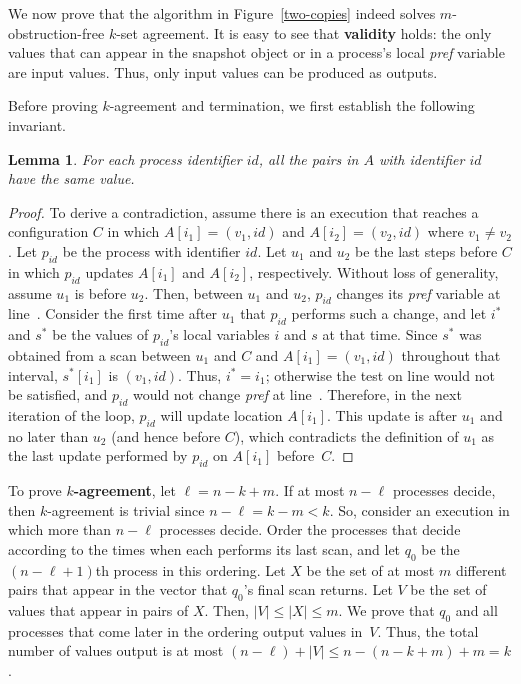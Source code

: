 \documentclass[11pt]{article}
\newtheorem{lemma}[theorem]{Lemma}
\newcounter{linenum}
\newcounter{ind}
\newcommand{\lref}[1]{\linenumref{#1}}
\begin{document}
We now prove that the algorithm in Figure~\ref{two-copies} indeed
solves $m$-obstruction-free $k$-set agreement. 
It is easy to see that {\bf validity} holds: the only values that can appear in the snapshot object or in a process's local {\it pref} variable are input values.  Thus, only input values can
be produced as outputs.  

Before proving $k$-agreement and termination, we 
first establish the following invariant. \begin{lemma}\label{invOne}
For each process identifier $id$, all the pairs in $A$ with identifier $id$ have the same value. 
\end{lemma}

\begin{proof}
To derive a contradiction, assume there is an execution that reaches 
a configuration $C$ in which
$A[i_1]=(v_1,id)$ and $A[i_2]=(v_2,id)$ where $v_1\neq v_2$.
Let $p_{id}$ be the process with identifier $id$.
Let $u_1$ and $u_2$ be the last steps before $C$ in which $p_{id}$ updates 
$A[i_1]$ and $A[i_2]$, respectively.
Without loss of generality, assume $u_1$ is before $u_2$.
Then, between $u_1$ and $u_2$, $p_{id}$ changes its {\it pref}
variable at line~\lref{change-pref}.  Consider the first time after
$u_1$ that $p_{id}$ performs such a change, and let
$i^*$ and $s^*$ be the values of $p_{id}$'s local variables $i$ and $s$ at that time.
Since $s^*$ was obtained from a scan between $u_1$ and $C$ and $A[i_1]=(v_1,id)$ throughout that interval, $s^*[i_1]$ is $(v_1,id)$.
Thus, $i^*=i_1$; otherwise the test on line \lref{cond} would not be satisfied,
and $p_{id}$ would not change {\it pref} at line~\lref{change-pref}.
Therefore, in the next iteration of the loop, $p_{id}$ will update location $A[i_1]$.
This update is after $u_1$ and no later than $u_2$ (and hence before
$C$), which contradicts the definition of $u_1$ as the last update
performed by $p_{id}$ on $A[i_1]$ before~$C$.
\end{proof}


To prove {\bf $k$-agreement}, 
let $\ell=n-k+m$. 
If at most $n-\ell$ processes decide, then $k$-agreement is trivial since
$n-\ell = k-m < k$.
So, consider an execution in which more than $n-\ell$ processes decide.
Order the processes that decide according to the times when each performs its last scan,
and let $q_0$ be the $(n-\ell+1)$th process in this ordering.
Let $X$ be the set of at most $m$ different pairs that appear in the vector that
$q_0$'s final scan returns. Let $V$ be the set of values that appear in pairs of $X$. 
Then, $|V|\leq|X|\leq m$.
We prove that $q_0$ and all processes that come later in the ordering
output values in~$V$.
Thus, the total number of values output is at most $(n-\ell) + |V| \leq n-(n-k+m)+m = k$.
\end{document}
